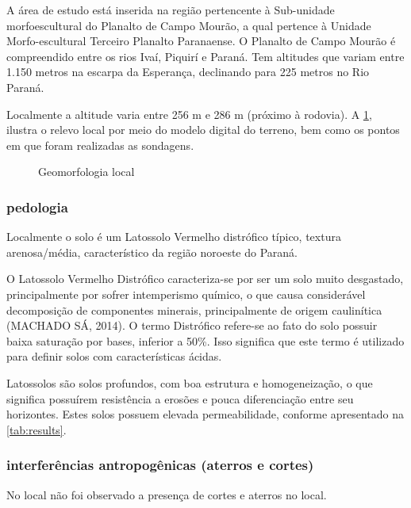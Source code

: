 A área de estudo está inserida na região pertencente à Sub-unidade morfoescultural do Planalto de Campo Mourão, a qual pertence à Unidade Morfo-escultural Terceiro Planalto Paranaense.
O Planalto de Campo Mourão é compreendido entre os rios Ivaí, Piquirí e Paraná. Tem altitudes que variam entre 1.150 metros na escarpa da Esperança, declinando para 225 metros no Rio Paraná.

Localmente a altitude varia entre 256 m e 286 m (próximo à rodovia).
A \cref{fig:geomorfologia}, ilustra o relevo local por meio do modelo digital do terreno,
bem como os pontos em que foram realizadas as sondagens.

\begin{figure}[htb!]
	\centering
	\setlength\fboxsep{0pt}
	\setlength\fboxrule{0.75pt}
	\caption{Geomorfologia local}%
	\label{fig:geomorfologia}
\end{figure}

\FloatBarrier



\subsubsection{pedologia}
Localmente o solo é um Latossolo Vermelho distrófico
típico, textura arenosa/média, característico da região noroeste do Paraná.

O Latossolo Vermelho Distrófico caracteriza-se por ser um solo muito desgastado, principalmente por sofrer intemperismo químico, o que causa considerável decomposição de componentes minerais, principalmente de origem
caulinítica (MACHADO SÁ, 2014).
O termo Distrófico refere-se ao fato do solo possuir baixa saturação por
bases, inferior a 50\%. Isso significa que este termo é utilizado para definir solos com
características ácidas.

Latossolos são solos profundos, com
boa estrutura e homogeneização, o que significa possuírem resistência a erosões e
pouca diferenciação entre seu horizontes. Estes solos possuem elevada
permeabilidade, conforme apresentado 
na \cref{tab:results}.

\subsubsection{interferências antropogênicas (aterros e cortes)}

No local não foi observado a presença de cortes e aterros no local.

